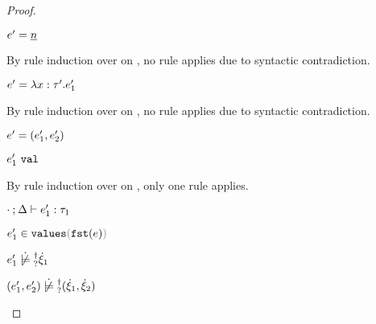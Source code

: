 \begin{proof}
\begin{byCases}
\begin{byCases}
\begin{byCases}
\begin{byCases}
\begin{byCases}
\begin{byCases}
\begin{pfsteps*}
              \item $e'=\underline{n}$ 
              \end{pfsteps*} 
              By rule induction over  on , no rule applies due to syntactic contradiction.
              \item[\text{(\ref{rule:VLam})}]
              \begin{pfsteps*} 
              \item $e'=\lambda x:\tau'.e_1'$ 
              \end{pfsteps*}
              By rule induction over  on , no rule applies due to syntactic contradiction.
              \item[\text{(\ref{rule:VPair})}] 
              \begin{pfsteps*} 
              \item $e'=(e_1' , e_2')$ 
              \item $e_1' ~\mathtt{val}$  
              \end{pfsteps*}
              By rule induction over  on , only one rule applies.
              \begin{byCases}
                \item[\text{(\ref{rule:TPair})}]
                \begin{pfsteps*}
                \item $\cdot \mathbin{;} \Delta \vdash e_1' : \tau_1$  
                \item $\inValues{e_1'}{\hfst{e}}$  
                \item $\cnotsatisfyormay{e_1'}{\hxi_1}$  
                \item $\cnotsatisfyormay{\hpair{e_1'}{e_2'}}{\cpair{\hxi_1}{\hxi_2}}$ 
                \end{pfsteps*} 
              \end{byCases}
              \item[\text{(\ref{rule:VInl})}] 
              \begin{pfsteps*} 

\end{pfsteps*}
\end{byCases}
\end{byCases}
\end{byCases}
\end{byCases}
\end{byCases}
\end{byCases}
\end{proof}
